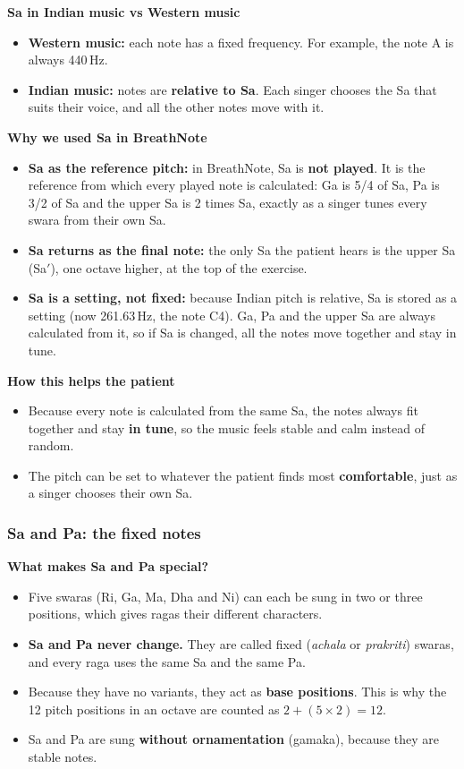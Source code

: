 \documentclass[12pt,a4paper]{article}
\newcommand{\Sah}{Sa\ensuremath{'}}     %
\begin{document}
\textbf{Sa in Indian music vs Western music}
\begin{itemize}
  \item \textbf{Western music:} each note has a fixed frequency. For example, the note A is always 440\,Hz.
  \item \textbf{Indian music:} notes are \textbf{relative to Sa}. Each singer chooses the Sa that suits their voice, and all the other notes move with it.
\end{itemize}

\textbf{Why we used Sa in BreathNote}
\begin{itemize}
  \item \textbf{Sa as the reference pitch:} in BreathNote, Sa is \textbf{not played}. It is the reference from which every played note is calculated: Ga is 5/4 of Sa, Pa is 3/2 of Sa and the upper Sa is 2 times Sa, exactly as a singer tunes every swara from their own Sa.
  \item \textbf{Sa returns as the final note:} the only Sa the patient hears is the upper Sa (\Sah), one octave higher, at the top of the exercise.
  \item \textbf{Sa is a setting, not fixed:} because Indian pitch is relative, Sa is stored as a setting (now 261.63\,Hz, the note C4). Ga, Pa and the upper Sa are always calculated from it, so if Sa is changed, all the notes move together and stay in tune.
\end{itemize}

\textbf{How this helps the patient}
\begin{itemize}
  \item Because every note is calculated from the same Sa, the notes always fit together and stay \textbf{in tune}, so the music feels stable and calm instead of random.
  \item The pitch can be set to whatever the patient finds most \textbf{comfortable}, just as a singer chooses their own Sa.
\end{itemize}

\subsubsection{Sa and Pa: the fixed notes}
\textbf{What makes Sa and Pa special?}
\begin{itemize}
  \item Five swaras (Ri, Ga, Ma, Dha and Ni) can each be sung in two or three positions, which gives ragas their different characters.
  \item \textbf{Sa and Pa never change.} They are called fixed (\emph{achala} or \emph{prakriti}) swaras, and every raga uses the same Sa and the same Pa.
  \item Because they have no variants, they act as \textbf{base positions}. This is why the 12 pitch positions in an octave are counted as $2 + (5 \times 2) = 12$.
  \item Sa and Pa are sung \textbf{without ornamentation} (gamaka), because they are stable notes.
\end{itemize}
\end{document}
